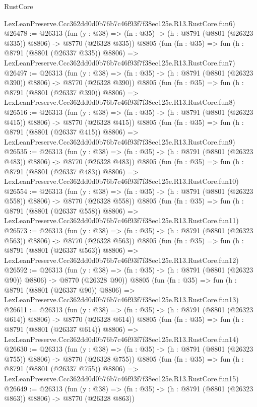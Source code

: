 \begin{lexlean}{RustCore}
\begin{coremodule}
    LexLeanPreserve.Ccc362dd0d0b76b7c46f93f7f38ec125e.R13.RustCore.fun6)
@26478 := @26313
    (fun (y : @38) => (fn : @35) -> (h : @8791 (@8801 (@26323 @335)) @8806) -> @8770 (@26328 @335))
    @8805
    (fun (fn : @35) =>
    fun (h : @8791 (@8801 (@26337 @335)) @8806) =>
    LexLeanPreserve.Ccc362dd0d0b76b7c46f93f7f38ec125e.R13.RustCore.fun7)
@26497 := @26313
    (fun (y : @38) => (fn : @35) -> (h : @8791 (@8801 (@26323 @390)) @8806) -> @8770 (@26328 @390))
    @8805
    (fun (fn : @35) =>
    fun (h : @8791 (@8801 (@26337 @390)) @8806) =>
    LexLeanPreserve.Ccc362dd0d0b76b7c46f93f7f38ec125e.R13.RustCore.fun8)
@26516 := @26313
    (fun (y : @38) => (fn : @35) -> (h : @8791 (@8801 (@26323 @415)) @8806) -> @8770 (@26328 @415))
    @8805
    (fun (fn : @35) =>
    fun (h : @8791 (@8801 (@26337 @415)) @8806) =>
    LexLeanPreserve.Ccc362dd0d0b76b7c46f93f7f38ec125e.R13.RustCore.fun9)
@26535 := @26313
    (fun (y : @38) => (fn : @35) -> (h : @8791 (@8801 (@26323 @483)) @8806) -> @8770 (@26328 @483))
    @8805
    (fun (fn : @35) =>
    fun (h : @8791 (@8801 (@26337 @483)) @8806) =>
    LexLeanPreserve.Ccc362dd0d0b76b7c46f93f7f38ec125e.R13.RustCore.fun10)
@26554 := @26313
    (fun (y : @38) => (fn : @35) -> (h : @8791 (@8801 (@26323 @558)) @8806) -> @8770 (@26328 @558))
    @8805
    (fun (fn : @35) =>
    fun (h : @8791 (@8801 (@26337 @558)) @8806) =>
    LexLeanPreserve.Ccc362dd0d0b76b7c46f93f7f38ec125e.R13.RustCore.fun11)
@26573 := @26313
    (fun (y : @38) => (fn : @35) -> (h : @8791 (@8801 (@26323 @563)) @8806) -> @8770 (@26328 @563))
    @8805
    (fun (fn : @35) =>
    fun (h : @8791 (@8801 (@26337 @563)) @8806) =>
    LexLeanPreserve.Ccc362dd0d0b76b7c46f93f7f38ec125e.R13.RustCore.fun12)
@26592 := @26313
    (fun (y : @38) => (fn : @35) -> (h : @8791 (@8801 (@26323 @90)) @8806) -> @8770 (@26328 @90))
    @8805
    (fun (fn : @35) =>
    fun (h : @8791 (@8801 (@26337 @90)) @8806) =>
    LexLeanPreserve.Ccc362dd0d0b76b7c46f93f7f38ec125e.R13.RustCore.fun13)
@26611 := @26313
    (fun (y : @38) => (fn : @35) -> (h : @8791 (@8801 (@26323 @614)) @8806) -> @8770 (@26328 @614))
    @8805
    (fun (fn : @35) =>
    fun (h : @8791 (@8801 (@26337 @614)) @8806) =>
    LexLeanPreserve.Ccc362dd0d0b76b7c46f93f7f38ec125e.R13.RustCore.fun14)
@26630 := @26313
    (fun (y : @38) => (fn : @35) -> (h : @8791 (@8801 (@26323 @755)) @8806) -> @8770 (@26328 @755))
    @8805
    (fun (fn : @35) =>
    fun (h : @8791 (@8801 (@26337 @755)) @8806) =>
    LexLeanPreserve.Ccc362dd0d0b76b7c46f93f7f38ec125e.R13.RustCore.fun15)
@26649 := @26313
    (fun (y : @38) => (fn : @35) -> (h : @8791 (@8801 (@26323 @863)) @8806) -> @8770 (@26328 @863))

\end{coremodule}
\end{lexlean}
